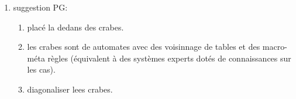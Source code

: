 \begin{enumerate}
                Et critique des notions de fronti\`ere du chaos.\\
                PG: fronti\`ere d'universalit\'e.\\
                PG: universalit\'e: ``gestion de table glorifi\'e''
        \item suggestion PG:
        \begin{enumerate}
                \item plac\'e la dedans des crabes.
                \item les crabes sont de automates avec des voisinnage
                        de tables et des macro-m\'eta r\`egles
                        (\'equivalent \`a des syst\`emes experts dot\'es
                        de connaissances sur les cas).
                \item diagonaliser lees crabes.
        \end{enumerate}
\end{enumerate}

